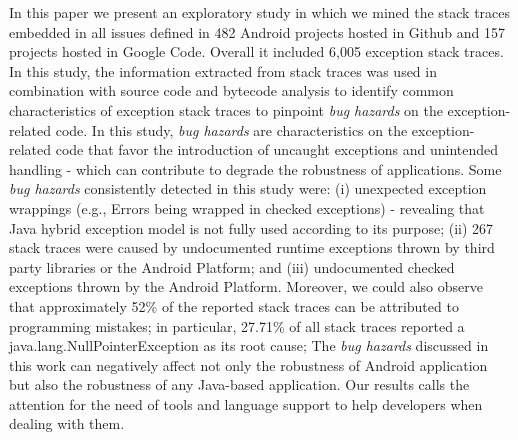 \documentclass[conference]{IEEEtran}
\begin{document}
In this paper we present an exploratory study in which we mined the stack 
traces embedded in all issues defined in 482 Android projects hosted in Github and 
157 projects hosted in Google Code. Overall it included 6,005 exception stack traces.
In this study, the information extracted from stack traces was used in combination 
with source code and bytecode analysis to identify common characteristics of exception 
stack traces to pinpoint \emph{bug hazards} on the exception-related code. 
In this study, \emph{bug hazards} are characteristics on the exception-related code that favor the introduction
of  uncaught exceptions and unintended handling - which can contribute to 
degrade the robustness of applications.
Some \emph{bug hazards} consistently detected in this study were: 
(i) unexpected exception wrappings (e.g., Errors being wrapped in checked exceptions)  - 
revealing that Java hybrid exception model is not fully used according to its purpose;
(ii) 267 stack traces were caused by undocumented runtime exceptions thrown by third party libraries or the Android Platform;
and (iii) undocumented checked exceptions thrown by the Android Platform. 
Moreover, we could also observe that approximately 52\% of the reported stack traces 
can be attributed to programming mistakes; in particular, 27.71\% of all stack traces 
reported a java.lang.NullPointerException as its root cause;
The \emph{bug hazards} discussed in this work can negatively affect not only the robustness of Android application 
but also the robustness of any Java-based application. 
Our results calls the attention for the need of tools and language support to help 
developers when dealing with them.









\end{document}
